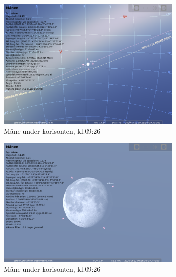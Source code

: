 \documentclass[./exercises.tex]{subfiles}
\begin{document}
\begin{itemize}
\begin{figure}[H]
\begin{subfigure}[b]{0.45\textwidth}
         \label{fig:three sin x}
     \end{subfigure}
     \hfill
     \begin{subfigure}[b]{0.45\textwidth}
         \centering
         \includegraphics[width=\textwidth]{Stellarium1/SSONewMoon/stellarium-002.png}
         \caption{Måne under horisonten, kl.09:26}
         \label{fig:three sin x}
     \end{subfigure}
     \hfill
     \begin{subfigure}[b]{0.45\textwidth}
         \centering
         \includegraphics[width=\textwidth]{Stellarium1/SSONewMoon/stellarium-003.png}
         \caption{Måne under horisonten, kl.09:26}
         \label{fig:three sin x}
     \end{subfigure}
     \hfill
     \begin{subfigure}[b]{0.45\textwidth}

\end{subfigure}
\end{figure}
\end{itemize}
\end{document}
